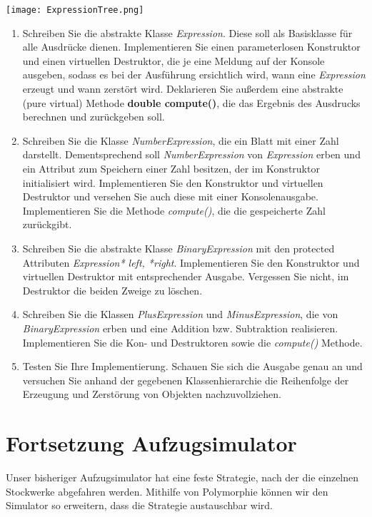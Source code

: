 \documentclass[
  accentcolor=tud1c,	%
  colorbacktitle,		%
  inverttitle,			%
  german,				%
  twoside
]{tudexercise}
\begin{document}
\texttt{[image: ExpressionTree.png]}

\begin{enumerate}

\item Schreiben Sie die abstrakte Klasse \emph{Expression}. Diese soll als Basisklasse für alle Ausdrücke dienen. Implementieren Sie einen parameterlosen Konstruktor und einen virtuellen Destruktor, die je eine Meldung auf der Konsole ausgeben, sodass es bei der Ausführung ersichtlich wird, wann eine \emph{Expression} erzeugt und wann zerstört wird. Deklarieren Sie außerdem eine abstrakte (pure virtual) Methode \textbf{double compute()}, die das Ergebnis des Ausdrucks berechnen und zurückgeben soll. 

\item Schreiben Sie die Klasse \emph{NumberExpression}, die ein Blatt mit einer Zahl darstellt. Dementsprechend soll \emph{NumberExpression} von \emph{Expression} erben und ein Attribut zum Speichern einer Zahl besitzen, der im Konstruktor initialisiert wird. Implementieren Sie den Konstruktor und virtuellen Destruktor und versehen Sie auch diese mit einer Konsolenausgabe. Implementieren Sie die Methode \emph{compute()}, die die gespeicherte Zahl zurückgibt.

\item Schreiben Sie die abstrakte Klasse \emph{BinaryExpression} mit den protected Attributen \emph{Expression* left, *right}. Implementieren Sie den Konstruktor und virtuellen Destruktor mit entsprechender Ausgabe. Vergessen Sie nicht, im Destruktor die beiden Zweige zu löschen. 

\item Schreiben Sie die Klassen \emph{PlusExpression} und \emph{MinusExpression}, die von \emph{BinaryExpression} erben und eine Addition bzw. Subtraktion realisieren. Implementieren Sie die Kon- und Destruktoren sowie die \emph{compute()} Methode.

\item Testen Sie Ihre Implementierung. Schauen Sie sich die Ausgabe genau an und versuchen Sie anhand der gegebenen Klassenhierarchie die Reihenfolge der Erzeugung und Zerstörung von Objekten  nachzuvollziehen.

\end{enumerate}

\section{Fortsetzung Aufzugsimulator}
Unser bisheriger Aufzugsimulator hat eine feste Strategie, nach der die einzelnen Stockwerke abgefahren werden. Mithilfe von Polymorphie können wir den Simulator so erweitern, dass die Strategie austauschbar wird.  
\end{document}
